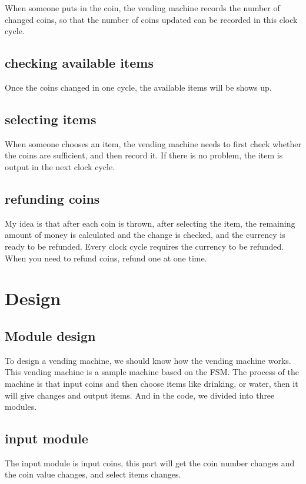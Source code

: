 \documentclass[12pt,a4paper]{article}
\begin{document}
When someone puts in the coin, the vending machine records the number of changed coins, so that the number of coins updated can be recorded in this clock cycle.

\subsection{checking available items}

Once the coins changed in one cycle, the available items will be shows up.

\subsection{selecting items}

When someone chooses an item, the vending machine needs to first check whether the coins are sufficient, and then record it. 
If there is no problem, the item is output in the next clock cycle.

\subsection{refunding coins}

My idea is that after each coin is thrown, after selecting the item, the remaining amount of money is calculated and the change is checked, and the currency is ready to be refunded. 
Every clock cycle requires the currency to be refunded.
When you need to refund coins, refund one at one time.

\newpage

\section{Design}
\subsection{Module design}

To design a vending machine, we should know how the vending machine works.
This vending machine is a sample machine based on the FSM.
The process of the machine is that input coins and then choose items like drinking, or water, then it will give changes and output items.
And in the code, we divided into three modules. 

\subsection{input module}
The input module is input coins, this part will get the coin number changes and the coin value changes, and select items changes.
\end{document}
